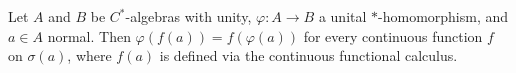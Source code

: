 Let $A$ and $B$ be $C^*$-algebras with unity, $\varphi: A \to B$ a unital $*$-homomorphism, and $a \in A$ normal. Then $\varphi(f(a)) = f(\varphi(a))$ for every continuous function $f$ on $\sigma(a)$, where $f(a)$ is defined via the continuous functional calculus.
